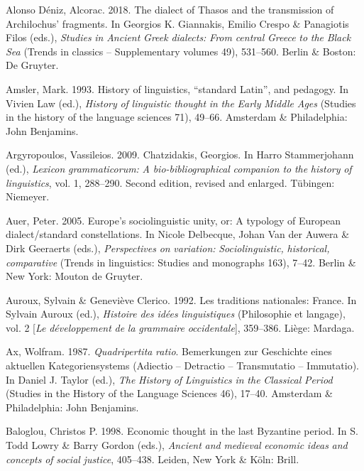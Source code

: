 Alonso Déniz, Alcorac. 2018. The dialect of Thasos and the transmission of Archilochus’ fragments. In Georgios K. Giannakis, Emilio Crespo \& Panagiotis Filos (eds.), \textit{Studies} \textit{in} \textit{Ancient} \textit{Greek} \textit{dialects:} \textit{From} \textit{central} \textit{Greece} \textit{to} \textit{the} \textit{Black} \textit{Sea} (Trends in classics – Supplementary volumes 49), 531–560. Berlin \& Boston: De Gruyter.

Amsler, Mark. 1993. History of linguistics, “standard Latin”, and pedagogy. In Vivien Law (ed.), \textit{History} \textit{of} \textit{linguistic} \textit{thought} \textit{in} \textit{the} \textit{Early} \textit{Middle} \textit{Ages} (Studies in the history of the language sciences 71), 49–66. Amsterdam \& Philadelphia: John Benjamins.

Argyropoulos, Vassileios. 2009. Chatzidakis, Georgios. In Harro Stammerjohann (ed.), \textit{Lexicon} \textit{grammaticorum:} \textit{A} \textit{bio-bibliographical} \textit{companion} \textit{to} \textit{the} \textit{history} \textit{of} \textit{linguistics}, vol. 1, 288–290. Second edition, revised and enlarged. Tübingen: Niemeyer.

Auer, Peter. 2005. Europe’s sociolinguistic unity, or: A typology of European dialect/standard constellations. In Nicole Delbecque, Johan Van der Auwera \& Dirk Geeraerts (eds.), \textit{Perspectives} \textit{on} \textit{variation:} \textit{Sociolinguistic,} \textit{historical,} \textit{comparative} (Trends in linguistics: Studies and monographs 163), 7–42. Berlin \& New York: Mouton de Gruyter.

Auroux, Sylvain \& Geneviève Clerico. 1992. Les traditions nationales:  France. In Sylvain Auroux (ed.), \textit{Histoire} \textit{des} \textit{idées} \textit{linguistiques} (Philosophie et langage), vol. 2 [\textit{Le} \textit{développement} \textit{de} \textit{la} \textit{grammaire} \textit{occidentale}], 359–386. Liège: Mardaga.

Ax, Wolfram. 1987. \textit{Quadripertita} \textit{ratio}. Bemerkungen zur Geschichte eines aktuellen Kategoriensystems (Adiectio – Detractio – Transmutatio – Immutatio). In Daniel J. Taylor (ed.), \textit{The} \textit{History} \textit{of} \textit{Linguistics} \textit{in} \textit{the} \textit{Classical} \textit{Period} (Studies in the History of the Language Sciences 46), 17–40. Amsterdam \& Philadelphia: John Benjamins.

Baloglou, Christos P. 1998. Economic thought in the last Byzantine period. In S. Todd Lowry \& Barry Gordon (eds.), \textit{Ancient} \textit{and} \textit{medieval} \textit{economic} \textit{ideas} \textit{and} \textit{concepts} \textit{of} \textit{social} \textit{justice}, 405–438. Leiden, New York \& Köln: Brill.

